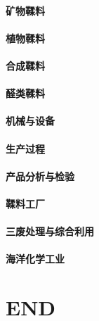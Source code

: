 \documentclass[UTF8]{../../ApplicationUniverse}
\begin{document}
        \subsubsection{矿物鞣料}
        \subsubsection{植物鞣料}
    \subsubsection{合成鞣料}
        \subsubsection{醛类鞣料}
    \subsubsection{机械与设备}
    \subsubsection{生产过程}
    \subsubsection{产品分析与检验}
    \subsubsection{鞣料工厂}
    \subsubsection{三废处理与综合利用}
\subsubsection{海洋化学工业}


\chapter{END}
\end{document}
